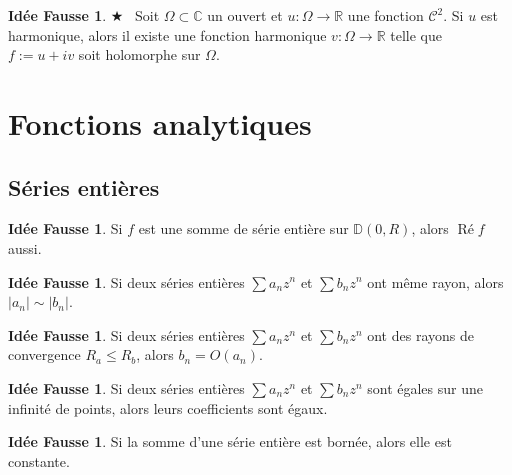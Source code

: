 \documentclass[11pt,a4paper]{article}
\newcommand{\D}{\mathbb{D}}
\newcommand{\R}{\mathbb{R}}
\newcommand{\C}{\mathbb{C}}
\DeclareMathOperator{\PR}{\text{Ré}}
\theoremstyle{definition}
\newtheorem{ideeFausse}[theoreme]{Idée Fausse}
\theoremstyle{plain}
\newcommand{\important}{$\bigstar$~}
\begin{document}
\begin{ideeFausse} \important
Soit $\Omega\subset \C$ un ouvert et $u : \Omega\to \R$ une fonction $\mathcal C^2$.
Si $u$ est harmonique, alors il existe une fonction harmonique $v : \Omega\to \R$ telle que $f:=u+iv$ soit holomorphe sur $\Omega$.
\end{ideeFausse}
%
%
%
%



\section{Fonctions analytiques}

\subsection{Séries entières}

\begin{ideeFausse}
Si $f$ est une somme de série entière sur $\D(0,R)$, alors $\PR f$ aussi.
\end{ideeFausse}

\begin{ideeFausse}
Si deux séries entières $\sum a_nz^n$ et $\sum b_nz^n$ ont même rayon, alors $|a_n| \sim |b_n|$.
\end{ideeFausse}

\begin{ideeFausse}
Si deux séries entières $\sum a_nz^n$ et $\sum b_nz^n$ ont  des rayons de convergence $R_a\leq R_b$, alors $b_n = O(a_n)$.
\end{ideeFausse}

\begin{ideeFausse}
Si deux séries entières $\sum a_nz^n$ et $\sum b_nz^n$ sont égales sur une infinité de points, alors leurs coefficients sont égaux.
\end{ideeFausse}

\begin{ideeFausse}
Si la somme d'une série entière est bornée, alors elle est constante.
\end{ideeFausse}
\end{document}

